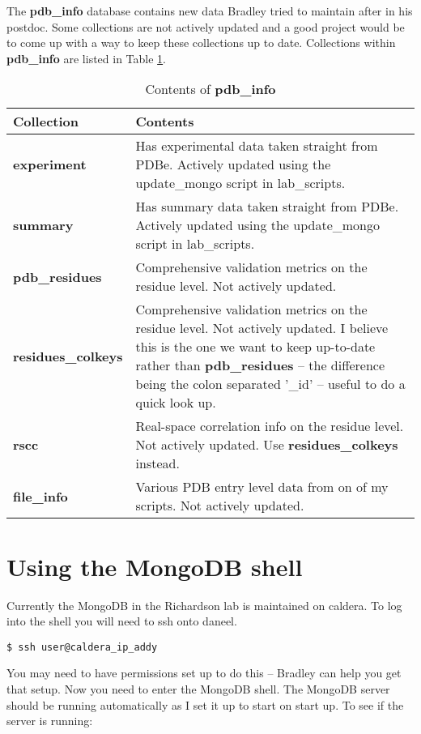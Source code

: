 \documentclass[12pt]{article}
\newcommand{\cmdline}[1]{\vspace{5mm} \noindent
\texttt{\$ #1}
\vspace{5mm}

}
\newcommand{\mdbdb}[1]{{\color{BlueViolet}\textbf{#1}}}
\newcommand{\mdbcol}[1]{{\color{Bittersweet}\textbf{#1}}}
\begin{document}
\noindent
The \mdbdb{pdb\_info} database contains new data Bradley tried to maintain after in his postdoc.
Some collections are not actively updated and a good project would be to come up with a way to keep these collections up to date.
Collections within \mdbdb{pdb\_info} are listed in Table \ref{tab:pdbinfoDB}.
\begin{table}[h]
\caption{Contents of \mdbdb{pdb\_info}}
\begin{tabular}{l|p{9cm}}
  \textbf{Collection} & \textbf{Contents} \\ \hline
  \mdbcol{experiment} & Has experimental data taken straight from PDBe. Actively updated using the update\_mongo script in lab\_scripts. \\ \hline
  \mdbcol{summary} & Has summary data taken straight from PDBe. Actively updated using the update\_mongo script in lab\_scripts. \\ \hline
   \mdbcol{pdb\_residues} & Comprehensive validation metrics on the residue level. Not actively updated. \\ \hline
   \mdbcol{residues\_colkeys} & Comprehensive validation metrics on the residue level. Not actively updated. I believe this is the one we want to keep up-to-date rather than \mdbcol{pdb\_residues} -- the difference being the colon separated '\_id' -- useful to do a quick look up. \\ \hline
   \mdbcol{rscc} & Real-space correlation info on the residue level. Not actively updated. Use \mdbcol{residues\_colkeys} instead. \\ \hline
   \mdbcol{file\_info} & Various PDB entry level data from on of my scripts. Not actively updated. \\ \hline
\end{tabular}
\label{tab:pdbinfoDB}
\end{table}

\section{Using the MongoDB shell}
Currently the MongoDB in the Richardson lab is maintained on caldera. 
To log into the shell you will need to ssh onto daneel.

\cmdline{ssh user@caldera\_ip\_addy}
\noindent
You may need to have permissions set up to do this -- Bradley can help you get that setup.
\noindent
Now you need to enter the MongoDB shell.
The MongoDB server should be running automatically as I set it up to start on start up.
To see if the server is running:
\end{document}
